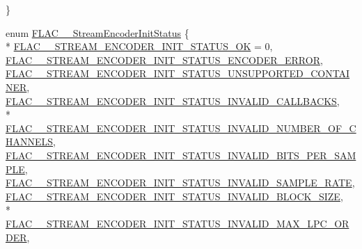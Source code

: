 \begin{DoxyCompactItemize}
 \}
\item 
enum \hyperlink{group__flac__stream__encoder_ga3bb869620af2b188d77982a5c30b047d}{F\+L\+A\+C\+\_\+\+\_\+\+Stream\+Encoder\+Init\+Status} \{ \\*
\hyperlink{group__flac__stream__encoder_gga3bb869620af2b188d77982a5c30b047da20501dce552da74c5df935eeaa0c9ee3}{F\+L\+A\+C\+\_\+\+\_\+\+S\+T\+R\+E\+A\+M\+\_\+\+E\+N\+C\+O\+D\+E\+R\+\_\+\+I\+N\+I\+T\+\_\+\+S\+T\+A\+T\+U\+S\+\_\+\+OK} = 0, 
\hyperlink{group__flac__stream__encoder_gga3bb869620af2b188d77982a5c30b047da9c64e5f9020d8799e1cd9d39d50e6955}{F\+L\+A\+C\+\_\+\+\_\+\+S\+T\+R\+E\+A\+M\+\_\+\+E\+N\+C\+O\+D\+E\+R\+\_\+\+I\+N\+I\+T\+\_\+\+S\+T\+A\+T\+U\+S\+\_\+\+E\+N\+C\+O\+D\+E\+R\+\_\+\+E\+R\+R\+OR}, 
\hyperlink{group__flac__stream__encoder_gga3bb869620af2b188d77982a5c30b047da8a822b011de88b67c114505ffef39327}{F\+L\+A\+C\+\_\+\+\_\+\+S\+T\+R\+E\+A\+M\+\_\+\+E\+N\+C\+O\+D\+E\+R\+\_\+\+I\+N\+I\+T\+\_\+\+S\+T\+A\+T\+U\+S\+\_\+\+U\+N\+S\+U\+P\+P\+O\+R\+T\+E\+D\+\_\+\+C\+O\+N\+T\+A\+I\+N\+ER}, 
\hyperlink{group__flac__stream__encoder_gga3bb869620af2b188d77982a5c30b047dac2cf461f02e20513003b8cadeae03f9f}{F\+L\+A\+C\+\_\+\+\_\+\+S\+T\+R\+E\+A\+M\+\_\+\+E\+N\+C\+O\+D\+E\+R\+\_\+\+I\+N\+I\+T\+\_\+\+S\+T\+A\+T\+U\+S\+\_\+\+I\+N\+V\+A\+L\+I\+D\+\_\+\+C\+A\+L\+L\+B\+A\+C\+KS}, 
\\*
\hyperlink{group__flac__stream__encoder_gga3bb869620af2b188d77982a5c30b047da0541c4f827f081b9f1c54c9441e4aa65}{F\+L\+A\+C\+\_\+\+\_\+\+S\+T\+R\+E\+A\+M\+\_\+\+E\+N\+C\+O\+D\+E\+R\+\_\+\+I\+N\+I\+T\+\_\+\+S\+T\+A\+T\+U\+S\+\_\+\+I\+N\+V\+A\+L\+I\+D\+\_\+\+N\+U\+M\+B\+E\+R\+\_\+\+O\+F\+\_\+\+C\+H\+A\+N\+N\+E\+LS}, 
\hyperlink{group__flac__stream__encoder_gga3bb869620af2b188d77982a5c30b047dad6d2631f464183c0c165155200882e6b}{F\+L\+A\+C\+\_\+\+\_\+\+S\+T\+R\+E\+A\+M\+\_\+\+E\+N\+C\+O\+D\+E\+R\+\_\+\+I\+N\+I\+T\+\_\+\+S\+T\+A\+T\+U\+S\+\_\+\+I\+N\+V\+A\+L\+I\+D\+\_\+\+B\+I\+T\+S\+\_\+\+P\+E\+R\+\_\+\+S\+A\+M\+P\+LE}, 
\hyperlink{group__flac__stream__encoder_gga3bb869620af2b188d77982a5c30b047da6fdcde9e18c37450c79e8f12b9d9c134}{F\+L\+A\+C\+\_\+\+\_\+\+S\+T\+R\+E\+A\+M\+\_\+\+E\+N\+C\+O\+D\+E\+R\+\_\+\+I\+N\+I\+T\+\_\+\+S\+T\+A\+T\+U\+S\+\_\+\+I\+N\+V\+A\+L\+I\+D\+\_\+\+S\+A\+M\+P\+L\+E\+\_\+\+R\+A\+TE}, 
\hyperlink{group__flac__stream__encoder_gga3bb869620af2b188d77982a5c30b047da652c445f1bd8b6cfb963a30bf416c95a}{F\+L\+A\+C\+\_\+\+\_\+\+S\+T\+R\+E\+A\+M\+\_\+\+E\+N\+C\+O\+D\+E\+R\+\_\+\+I\+N\+I\+T\+\_\+\+S\+T\+A\+T\+U\+S\+\_\+\+I\+N\+V\+A\+L\+I\+D\+\_\+\+B\+L\+O\+C\+K\+\_\+\+S\+I\+ZE}, 
\\*
\hyperlink{group__flac__stream__encoder_gga3bb869620af2b188d77982a5c30b047da38a69e94b3333e4ba779d2ff8f43f64e}{F\+L\+A\+C\+\_\+\+\_\+\+S\+T\+R\+E\+A\+M\+\_\+\+E\+N\+C\+O\+D\+E\+R\+\_\+\+I\+N\+I\+T\+\_\+\+S\+T\+A\+T\+U\+S\+\_\+\+I\+N\+V\+A\+L\+I\+D\+\_\+\+M\+A\+X\+\_\+\+L\+P\+C\+\_\+\+O\+R\+D\+ER}, 

\end{DoxyCompactItemize}
